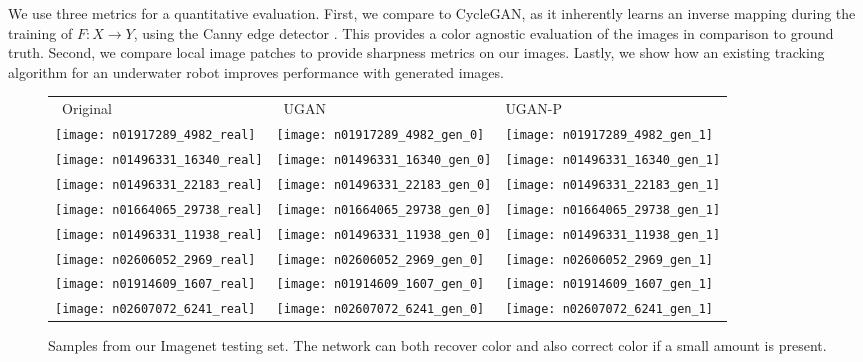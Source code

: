 We use three metrics for a quantitative evaluation. First, we compare to CycleGAN, as it inherently learns an inverse
mapping during the training of $F: X \rightarrow Y$, using the Canny edge detector
\cite{canny1986computational}. This provides a color agnostic evaluation of the images in comparison to ground truth.
Second, we compare local image patches to provide sharpness metrics on our images. Lastly, we show how an existing
tracking algorithm for an underwater robot improves performance with generated images.

\begin{figure}
\centering
\begin{tabular}{p{1.7cm} p{1.7cm} p{1.7cm}}

   ~\quad Original & ~\quad UGAN & \quad UGAN-P \\

   \texttt{[image: n01917289\_4982\_real]} &
   \texttt{[image: n01917289\_4982\_gen\_0]} &
   \texttt{[image: n01917289\_4982\_gen\_1]} \\

   \texttt{[image: n01496331\_16340\_real]} &
   \texttt{[image: n01496331\_16340\_gen\_0]} &
   \texttt{[image: n01496331\_16340\_gen\_1]} \\
   
   \texttt{[image: n01496331\_22183\_real]} &
   \texttt{[image: n01496331\_22183\_gen\_0]} &
   \texttt{[image: n01496331\_22183\_gen\_1]} \\
   
   \texttt{[image: n01664065\_29738\_real]} &
   \texttt{[image: n01664065\_29738\_gen\_0]} &
   \texttt{[image: n01664065\_29738\_gen\_1]} \\
   
   \texttt{[image: n01496331\_11938\_real]} &
   \texttt{[image: n01496331\_11938\_gen\_0]} &
   \texttt{[image: n01496331\_11938\_gen\_1]} \\
   
   \texttt{[image: n02606052\_2969\_real]} &
   \texttt{[image: n02606052\_2969\_gen\_0]} &
   \texttt{[image: n02606052\_2969\_gen\_1]} \\
   
   \texttt{[image: n01914609\_1607\_real]} &
   \texttt{[image: n01914609\_1607\_gen\_0]} &
   \texttt{[image: n01914609\_1607\_gen\_1]} \\

   \texttt{[image: n02607072\_6241\_real]} &
   \texttt{[image: n02607072\_6241\_gen\_0]} &
   \texttt{[image: n02607072\_6241\_gen\_1]} \\

\end{tabular}
\caption{Samples from our Imagenet testing set. The network can both recover color and also correct color if a small amount is 
present.}
\label{fig:test_samples}
\end{figure}

